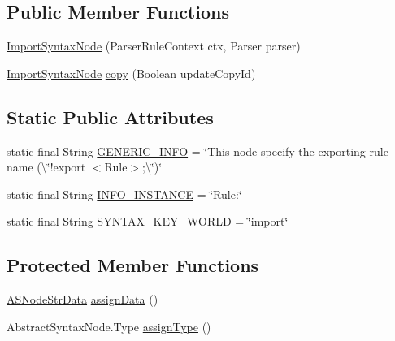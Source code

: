 \subsection*{Public Member Functions}
\begin{DoxyCompactItemize}
\item 
\hyperlink{classit_1_1emarolab_1_1cagg_1_1core_1_1language_1_1syntax_1_1abstractTree_1_1syntaxNodeType_1_1ImportSyntaxNode_a627e10947a6adc6b00c9327ba27a7ccf}{Import\-Syntax\-Node} (Parser\-Rule\-Context ctx, Parser parser)
\item 
\hyperlink{classit_1_1emarolab_1_1cagg_1_1core_1_1language_1_1syntax_1_1abstractTree_1_1syntaxNodeType_1_1ImportSyntaxNode}{Import\-Syntax\-Node} \hyperlink{classit_1_1emarolab_1_1cagg_1_1core_1_1language_1_1syntax_1_1abstractTree_1_1syntaxNodeType_1_1ImportSyntaxNode_abeace229760abe7baedce6f3f0991079}{copy} (Boolean update\-Copy\-Id)
\end{DoxyCompactItemize}
\subsection*{Static Public Attributes}
\begin{DoxyCompactItemize}
\item 
static final String \hyperlink{classit_1_1emarolab_1_1cagg_1_1core_1_1language_1_1syntax_1_1abstractTree_1_1syntaxNodeType_1_1ImportSyntaxNode_aaaa85889eb972b431d492373b96f1825}{G\-E\-N\-E\-R\-I\-C\-\_\-\-I\-N\-F\-O} = \char`\"{}This node specify the exporting rule name (\textbackslash{}\char`\"{}!export $<$Rule$>$;\textbackslash{}\char`\"{})\char`\"{}
\item 
static final String \hyperlink{classit_1_1emarolab_1_1cagg_1_1core_1_1language_1_1syntax_1_1abstractTree_1_1syntaxNodeType_1_1ImportSyntaxNode_ae5a18e7e9f0ff6ebb43a2976b0aff607}{I\-N\-F\-O\-\_\-\-I\-N\-S\-T\-A\-N\-C\-E} = \char`\"{}Rule\-:\char`\"{}
\item 
static final String \hyperlink{classit_1_1emarolab_1_1cagg_1_1core_1_1language_1_1syntax_1_1abstractTree_1_1syntaxNodeType_1_1ImportSyntaxNode_ae366a5d954b86554d9e1eb0b52359cbd}{S\-Y\-N\-T\-A\-X\-\_\-\-K\-E\-Y\-\_\-\-W\-O\-R\-L\-D} = \char`\"{}import\char`\"{}
\end{DoxyCompactItemize}
\subsection*{Protected Member Functions}
\begin{DoxyCompactItemize}
\item 
\hyperlink{classit_1_1emarolab_1_1cagg_1_1core_1_1language_1_1syntax_1_1abstractTree_1_1AbstractDataFactory_1_1ASNodeStrData}{A\-S\-Node\-Str\-Data} \hyperlink{classit_1_1emarolab_1_1cagg_1_1core_1_1language_1_1syntax_1_1abstractTree_1_1syntaxNodeType_1_1ImportSyntaxNode_a1baaf12aec4210c6f6cd202eacbd6260}{assign\-Data} ()
\item 
Abstract\-Syntax\-Node.\-Type \hyperlink{classit_1_1emarolab_1_1cagg_1_1core_1_1language_1_1syntax_1_1abstractTree_1_1syntaxNodeType_1_1ImportSyntaxNode_a9f32725351c751d063de2338105b41fd}{assign\-Type} ()
\end{DoxyCompactItemize}


